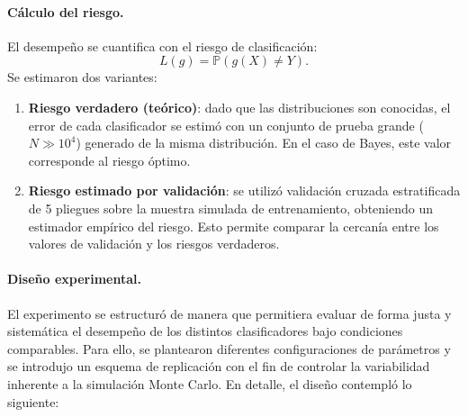 \documentclass[10pt]{article}
\begin{document}
\paragraph{Cálculo del riesgo.}
El desempeño se cuantifica con el riesgo de clasificación:
\[
L(g) = \mathbb{P}(g(X) \neq Y).
\]
Se estimaron dos variantes:
\begin{enumerate}
    \item \textbf{Riesgo verdadero (teórico)}: dado que las distribuciones son conocidas, el error de cada clasificador se estimó con un conjunto de prueba grande ($N \gg 10^4$) generado de la misma distribución. En el caso de Bayes, este valor corresponde al riesgo óptimo.
    \item \textbf{Riesgo estimado por validación}: se utilizó validación cruzada estratificada de 5 pliegues sobre la muestra simulada de entrenamiento, obteniendo un estimador empírico del riesgo. Esto permite comparar la cercanía entre los valores de validación y los riesgos verdaderos.
\end{enumerate}

\paragraph{Diseño experimental.}
El experimento se estructuró de manera que permitiera evaluar de forma justa y sistemática el desempeño de los distintos clasificadores bajo condiciones comparables. Para ello, se plantearon diferentes configuraciones de parámetros y se introdujo un esquema de replicación con el fin de controlar la variabilidad inherente a la simulación Monte Carlo. En detalle, el diseño contempló lo siguiente:
\end{document}
